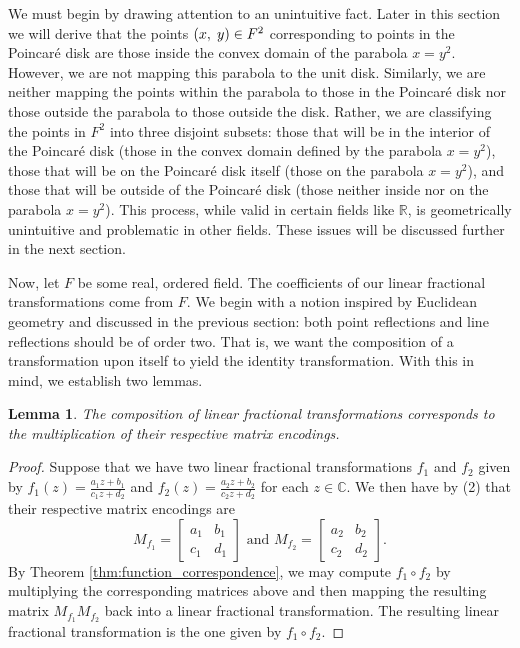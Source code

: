 \documentclass[12pt]{article}
\newcommand{\R}{\mathbb{R}}
\newcommand{\C}{\mathbb{C}}
\newcommand{\lftmat}[4]{\begin{bmatrix} {#1} & {#2} \\ {#3} & {#4} \end{bmatrix}}
\newcommand{\ttc}{, \hspace{1mm}}
\newcommand{\poincare}{Poincar\'{e} }
\theoremstyle{plain}
\newtheorem{lemma}[theorem]{Lemma}
\theoremstyle{definition}
\begin{document}
We must begin by drawing attention to an unintuitive fact. Later in this section we will derive that the points $(x\ttc y) \in F^2$ corresponding to points in the \poincare disk are those inside the convex domain of the parabola $x = y^2$. However, we are not mapping this parabola to the unit disk. Similarly, we are neither mapping the points within the parabola to those in the \poincare disk nor those outside the parabola to those outside the disk. Rather, we are classifying the points in $F^2$ into three disjoint subsets: those that will be in the interior of the \poincare disk (those in the convex domain defined by the parabola $x = y^2$), those that will be on the \poincare disk itself (those on the parabola $x = y^2$), and those that will be outside of the \poincare disk (those neither inside nor on the parabola $x = y^2$). This process, while valid in certain fields like $\R$, is geometrically unintuitive and problematic in other fields. These issues will be discussed further in the next section. 

Now, let $F$ be some real, ordered field. The coefficients of our linear fractional transformations come from $F$. We begin with a notion inspired by Euclidean geometry and discussed in the previous section: both point reflections and line reflections should be of order two. That is, we want the composition of a transformation upon itself to yield the identity transformation. With this in mind, we establish two lemmas.

\begin{lemma} 
	The composition of linear fractional transformations corresponds to the multiplication of their respective matrix encodings.
\end{lemma}

\begin{proof} 
	Suppose that we have two linear fractional transformations $f_1$ and $f_2$ given by $f_1(z) = \frac{a_1z+b_1}{c_1z+d_2}$ and $f_2(z) = \frac{a_2z+b_2}{c_2z+d_2}$ for each $z \in \C$. We then have by (2) that their respective matrix encodings are 
\[ 
	M_{f_1} = \lftmat{a_1}{b_1}{c_1}{d_1} 
	\text{ and } 
	M_{f_2} =  \lftmat{a_2}{b_2}{c_2}{d_2}. 
\] 
	By Theorem \ref{thm:function_correspondence}, we may compute $f_1\circ f_2$ by multiplying the corresponding matrices above and then mapping the resulting matrix $M_{f_1}M_{f_2}$ back into a linear fractional transformation. The resulting linear fractional transformation is the one given by $f_1\circ f_2$.
\end{proof}	
	
\end{document}
